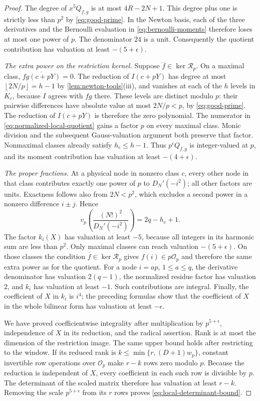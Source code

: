 \documentclass[11pt,letterpaper]{article}
\theoremstyle{definition}
\newcommand{\floor}[1]{\left\lfloor #1\right\rfloor}
\begin{document}
\begin{proof}
The degree of $x^5Q_{f,g}$ is at most $4R-2N+1$.
This degree plus one is strictly less than $p^2$ by
\eqref{eq:good-prime}. In the Newton basis, each of the three
derivatives and the Bernoulli evaluation in
\eqref{eq:bernoulli-moments} therefore loses at most one power of $p$.
The denominator $24$ is a unit. Consequently the quotient contribution
has valuation at least $-(5+\epsilon)$.

\emph{The extra power on the restriction kernel.}
Suppose $\overline f\in\ker\mathcal R_p$. On a maximal class,
$\overline{fg(c+pY)}=0$. The reduction of $I(c+pY)$ has degree at most
$\floor{2N/p}=h-1$ by \cref{lem:newton-tools}(iii), and vanishes at
each of the $h$ levels in $K_c$, because $I$ agrees with $fg$ there.
These levels are distinct modulo $p$: their pairwise differences have
absolute value at most $2N/p<p$, by \eqref{eq:good-prime}.
The reduction of $I(c+pY)$ is therefore the zero polynomial.
The numerator in \eqref{eq:normalized-local-quotient} gains a factor
$p$ on every maximal class. Monic division and the subsequent
Gauss-valuation argument both preserve that factor. Nonmaximal
classes already satisfy $h_c\le h-1$.
Thus $p^\epsilon Q_{f,g}$ is integer-valued at $p$, and its moment
contribution has valuation at least $-(4+\epsilon)$.

\emph{The proper fractions.}
At a physical node in nonzero class $c$, every other node in that
class contributes exactly one power of $p$ to $D_N'(-i^2)$; all
other factors are units. Exactness follows also from $2N<p^2$,
which excludes a second power in a nonzero difference $i\pm j$.
Hence
\[
 v_p\left(\frac{(N!)^2}{D_N'(-i^2)}\right)=2q-h_c+1.
\]
The factor $k_i(X)$ has valuation at least $-5$, because all integers
in its harmonic sum are less than $p^2$. Only maximal classes can
reach valuation $-(5+\epsilon)$. On those classes the condition
$\overline f\in\ker\mathcal R_p$ gives $f(i)\in p\mathcal O_p$
and therefore the same extra power as for the quotient.
For a node $i=ap$, $1\le a\le q$, the derivative denominator has
valuation $2(q-1)$, the normalized residue factor has valuation $2$,
and $k_i$ has valuation at least $-1$. Such contributions are integral.
Finally, the coefficient of $X$ in $k_i$ is $i^4$; the preceding
formulas show that the coefficient of $X$ in the whole bilinear form
has valuation at least $-\epsilon$.

We have proved coefficientwise integrality after multiplication by
$p^{5+\epsilon}$, independence of $X$ in its reduction, and the
radical assertion. Rank is at most the dimension of the restriction
image. The same upper bound holds after restricting to the window.
If its reduced rank is $k\le\min\{r,(D+1)w_p\}$, constant invertible
row operations over $\mathcal O_p$ make $r-k$ rows zero modulo $p$.
Because the reduction is independent of $X$, every coefficient in
each such row is divisible by $p$. The determinant of the scaled
matrix therefore has valuation at least $r-k$. Removing the scale
$p^{5+\epsilon}$ from its $r$ rows proves
\eqref{eq:local-determinant-bound}.
\end{proof}
\end{document}
